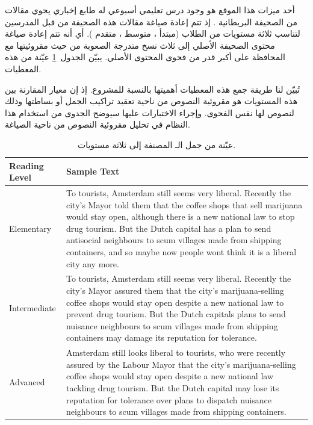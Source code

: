 أحد ميزات هذا الموقع هو وجود درس تعليمي أسبوعي له طابع إخباري يحوي مقالات من الصحيفة البريطانية .
إذ تتم إعادة صياغة مقالات هذه الصحيفة من قبل المدرسين لتناسب ثلاثة مستويات من الطلاب
(مبتدأ ، متوسط ، متقدم ).
أي أنه تتم إعادة صياغة محتوى الصحيفة الأصلي إلى ثلاث نسخ متدرجة الصعوبة من حيث مقروئيتها مع المحافظة على أكبر قدر من فحوى المحتوى الأصلي.
يبيّن الجدول~\ref{tbl:corpus:ose} عيّنة من هذه المعطيات.

تُبيّن لنا طريقة جمع هذه المعطيات أهميتها بالنسبة للمشروع.
إذ إن معيار المقارنة بين هذه المستويات هو مقروئية النصوص من ناحية تعقيد تراكيب الجمل أو بساطتها وذلك لنصوص لها نفس الفحوى.
وإجراء الاختبارات عليها سيوضح الجدوى من استخدام هذا النظام في تحليل مقروئية النصوص من ناحية الصياغة.

\begin{table}[htb]
	\centering
	{
		\setlength{\tabcolsep}{0.5em} %
		\renewcommand{\arraystretch}{1.4}%
		
		\begin{tabular}{|>{\arraybackslash}p{}|>{\arraybackslash}p{}|}
			\hline
			\textbf{Reading Level} &
			\textbf{Sample Text} \\
			\hline 
			Elementary &
			To tourists, Amsterdam still seems very liberal. Recently the city’s Mayor told
			them that the coffee shops that sell marijuana would stay open, although there
			is a new national law to stop drug tourism. But the Dutch capital has a plan
			to send antisocial neighbours to scum villages made from shipping containers,
			and so maybe now people wont think it is a liberal city any more. \\
			\hline 
			Intermediate &
			To tourists, Amsterdam still seems very liberal. Recently the city’s Mayor assured them that the city’s marijuana-selling coffee shops would stay open despite a new national law to prevent drug tourism. But the Dutch capitals plans
			to send nuisance neighbours to scum villages made from shipping containers
			may damage its reputation for tolerance. \\
			\hline 
			Advanced &
			Amsterdam still looks liberal to tourists, who were recently assured by the
			Labour Mayor that the city’s marijuana-selling coffee shops would stay open
			despite a new national law tackling drug tourism. But the Dutch capital may
			lose its reputation for tolerance over plans to dispatch nuisance neighbours to
			scum villages made from shipping containers. \\
			\hline 
		\end{tabular}
	}
	\caption{%
		عيّنة من جمل الـ  المصنفة إلى ثلاثة مستويات.
	}
	\label{tbl:corpus:ose}
\end{table}

